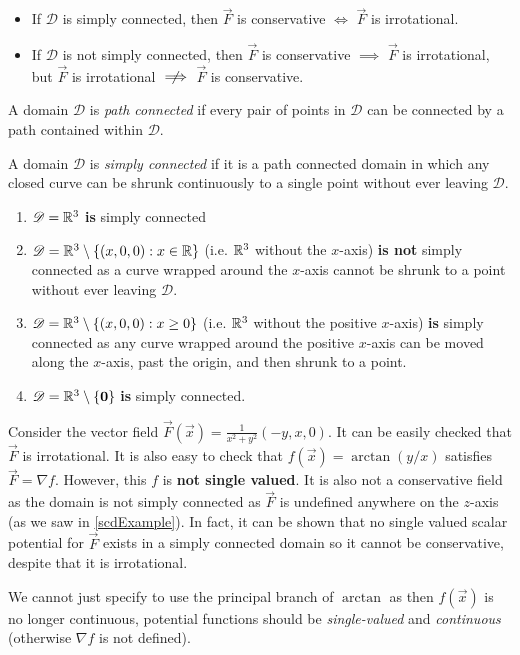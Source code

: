 \documentclass[../main.tex]{subfiles}
\begin{document}
\begin{remark}[Summary]
  \begin{itemize}
    \item If $\mathscr{D}$ is simply connected, then $\vec{F}$ is conservative $\iff$ $\vec{F}$ is irrotational.
    \item If $\mathscr{D}$ is not simply connected, then $\vec{F}$ is conservative $\implies$ $\vec{F}$ is irrotational, but $\vec{F}$ is irrotational $\centernot\implies$ $\vec{F}$ is conservative.
  \end{itemize}
\end{remark}
\begin{definition}
  A domain $\mathscr{D}$  is \textit{path connected} if every pair of points in $\mathscr{D}$ can be connected by a path contained within $\mathscr{D}$.
\end{definition}
\begin{definition}
  A domain $\mathscr{D}$ is \textit{simply connected} if it is a path connected domain in which any closed curve can be shrunk continuously to a single point without ever leaving $\mathscr{D}$.
\end{definition}
\begin{example}
  \label{scdExample}
  \begin{enumerate}
    \item $\mathscr{D} = \mathbb{R}^3$ \textbf{is} simply connected
    \item $\mathscr{D} = \mathbb{R}^3 \setminus \{(x, 0, 0): x \in \mathbb{R}\}$ (i.e. $\mathbb{R}^3$ without the $x$-axis) \textbf{is not} simply connected as a curve wrapped around the $x$-axis cannot be shrunk to a point without ever leaving $\mathscr{D}$.
    \item $\mathscr{D} = \mathbb{R}^3 \setminus \{(x, 0, 0): x \geq 0\}$ (i.e. $\mathbb{R}^3$ without the positive $x$-axis) \textbf{is} simply connected as any curve wrapped around the positive $x$-axis can be moved along the $x$-axis, past the origin, and then shrunk to a point.
    \item $\mathscr{D} = \mathbb{R}^3 \setminus \{\mathbf{\bm{0}}\}$ \textbf{is} simply connected.
  \end{enumerate}
\end{example}
\begin{example}
  Consider the vector field $\vec{F}(\vec{x}) = \frac{1}{x^2 + y^2}(-y, x, 0)$.
  It can be easily checked that $\vec{F}$ is irrotational.
  It is also easy to check that $f(\vec{x}) = \arctan(y/x)$ satisfies $\vec{F} = \nabla f$.
  However, this $f$ is \textbf{not single valued}.
  It is also not a conservative field as the domain is not simply connected as $\vec{F}$ is undefined anywhere on the $z$-axis (as we saw in \cref{scdExample}).
  In fact, it can be shown that no single valued scalar potential for $\vec{F}$ exists in a simply connected domain so it cannot be conservative, despite that it is irrotational.

  We cannot just specify to use the principal branch of $\arctan$ as then $f(\vec{x})$ is no longer continuous, potential functions should be \textit{single-valued} and \textit{continuous} (otherwise $\nabla f$ is not defined).
\end{example}
\end{document}
